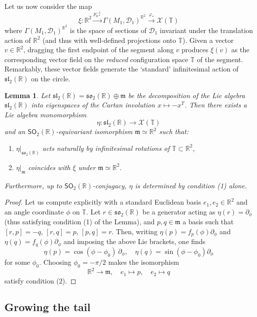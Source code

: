 \documentclass{article}
\def\fsl{\mathfrak{sl}}
\def\fso{\mathfrak{so}}
\def\fm{\mathfrak{m}}
\def\sD{\mathcal{D}}
\def\RR{\mathbb{R}}
\def\TT{\mathbb{T}}
\def\XX{\mathcal{X}}
\def\SO{\mathsf{SO}}
\newtheorem{lem}{Lemma}
\theoremstyle{definition}
\begin{document}
Let us now consider the map
$$ \xi : \RR^2 \xrightarrow{ p_{0*}^{-1}}  \Gamma(M_1,\sD_1)^{\RR^2} \xrightarrow{\varphi_*} \XX(\TT) $$
where $\Gamma(M_1,\sD_1)^{\RR^2}$ is the space of sections of $\sD_1$
invariant under the translation action of $\RR^2$ (and thus with well-defined projections onto
$\TT$). Given a vector $v \in \RR^2$, dragging the first endpoint
of the segment along $v$ produces $\xi(v)$ as the corresponding
vector field on the \emph{reduced} configuration space $\TT$ of the segment.
Remarkably, these vector fields generate the `standard' infinitesimal action of $\fsl_2(\RR)$
on the circle.
\begin{lem}
        Let $\fsl_2(\RR) = \fso_2(\RR) \oplus \fm$ be the decomposition
        of the Lie algebra $\fsl_2(\RR)$ into eigenspaces of the Cartan
        involution $x\mapsto-x^T$. Then there exists a Lie algebra monomorphism
        $$ \eta : \fsl_2(\RR) \to \XX(\TT) $$
        and an $\SO_2(\RR)$-equivariant isomorphism $\fm\simeq\RR^2$
        such that:
        \begin{enumerate}
                \item $\eta|_{\fso_2(\RR)}$ acts naturally by infinitesimal rotations of $\TT\subset \RR^2$,
                \item $\eta|_\fm$ coincides with $\xi$ under $\fm\simeq\RR^2$.
        \end{enumerate}
        Furthermore, up to $\SO_2(\RR)$-conjugacy, $\eta$ is determined by condition (1) alone.
\end{lem}
\begin{proof}
        Let us compute explicitly with a standard Euclidean basis $e_1,e_2 \in \RR^2$
        and an angle coordinate $\phi$ on $\TT$. Let $r \in \fso_2(\RR)$ be a generator
        acting as $\eta(r)=\partial_\phi$ (thus satisfying condition (1) of the Lemma), 
        and $p,q \in \fm$ a basis such that
        $[r,p]=-q$, $[r,q]=p$, $[p,q]=r$.
        Then, writing $\eta(p) = f_p(\phi)\partial_\phi$ and $\eta(q) = f_q(\phi)\partial_\phi$ and
        imposing the above Lie brackets,
        one finds 
        $$ \eta(p) = \cos(\phi-\phi_0)\ \partial_\phi,\quad \eta(q) = \sin(\phi-\phi_0)\partial_\phi $$
        for some $\phi_0$. Choosing $\phi_0=-\pi/2$ makes the isomorphism
        $$ \RR^2 \to \fm,\quad e_1 \mapsto p,\quad e_2\mapsto q $$
        satisfy condition (2).
\end{proof}

\subsection{Growing the tail}
\end{document}

